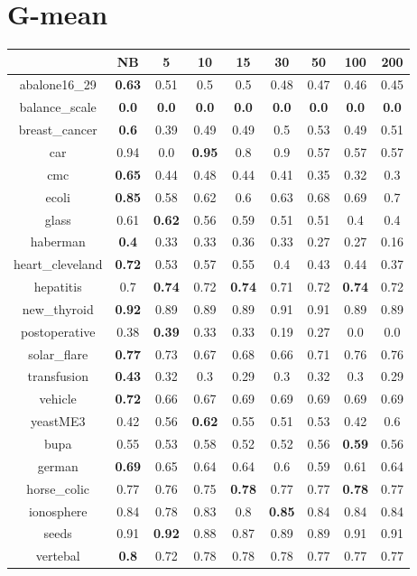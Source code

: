 \documentclass{article}%
\begin{document}
%
\section*{G{-}mean}%
\begin{tabular}{c|cccccccc}%
\hline%
&NB&5&10&15&30&50&100&200\\%
\hline%
abalone16\_29&\textbf{0.63}&0.51&0.5&0.5&0.48&0.47&0.46&0.45\\%
\hline%
balance\_scale&\textbf{0.0}&\textbf{0.0}&\textbf{0.0}&\textbf{0.0}&\textbf{0.0}&\textbf{0.0}&\textbf{0.0}&\textbf{0.0}\\%
\hline%
breast\_cancer&\textbf{0.6}&0.39&0.49&0.49&0.5&0.53&0.49&0.51\\%
\hline%
car&0.94&0.0&\textbf{0.95}&0.8&0.9&0.57&0.57&0.57\\%
\hline%
cmc&\textbf{0.65}&0.44&0.48&0.44&0.41&0.35&0.32&0.3\\%
\hline%
ecoli&\textbf{0.85}&0.58&0.62&0.6&0.63&0.68&0.69&0.7\\%
\hline%
glass&0.61&\textbf{0.62}&0.56&0.59&0.51&0.51&0.4&0.4\\%
\hline%
haberman&\textbf{0.4}&0.33&0.33&0.36&0.33&0.27&0.27&0.16\\%
\hline%
heart\_cleveland&\textbf{0.72}&0.53&0.57&0.55&0.4&0.43&0.44&0.37\\%
\hline%
hepatitis&0.7&\textbf{0.74}&0.72&\textbf{0.74}&0.71&0.72&\textbf{0.74}&0.72\\%
\hline%
new\_thyroid&\textbf{0.92}&0.89&0.89&0.89&0.91&0.91&0.89&0.89\\%
\hline%
postoperative&0.38&\textbf{0.39}&0.33&0.33&0.19&0.27&0.0&0.0\\%
\hline%
solar\_flare&\textbf{0.77}&0.73&0.67&0.68&0.66&0.71&0.76&0.76\\%
\hline%
transfusion&\textbf{0.43}&0.32&0.3&0.29&0.3&0.32&0.3&0.29\\%
\hline%
vehicle&\textbf{0.72}&0.66&0.67&0.69&0.69&0.69&0.69&0.69\\%
\hline%
yeastME3&0.42&0.56&\textbf{0.62}&0.55&0.51&0.53&0.42&0.6\\%
\hline%
bupa&0.55&0.53&0.58&0.52&0.52&0.56&\textbf{0.59}&0.56\\%
\hline%
german&\textbf{0.69}&0.65&0.64&0.64&0.6&0.59&0.61&0.64\\%
\hline%
horse\_colic&0.77&0.76&0.75&\textbf{0.78}&0.77&0.77&\textbf{0.78}&0.77\\%
\hline%
ionosphere&0.84&0.78&0.83&0.8&\textbf{0.85}&0.84&0.84&0.84\\%
\hline%
seeds&0.91&\textbf{0.92}&0.88&0.87&0.89&0.89&0.91&0.91\\%
\hline%
vertebal&\textbf{0.8}&0.72&0.78&0.78&0.78&0.77&0.77&0.77\\%
\hline%
\end{tabular}

%
\end{document}
